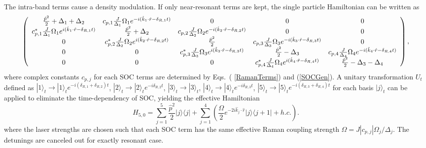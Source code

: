 \documentclass[twocolumn,prl,floatfix,citeautoscript,nofootinbib]{revtex4}
\begin{document}
The intra-band terms cause a density modulation. If only near-resonant terms
are kept, the single particle Hamiltonian can be written as
\[
\left(
\begin{array}{ccccc}
\frac{\hat{p}^{2}}{2}+\Delta _{1}+\Delta _{2} & c_{p,1}\frac{J}{\Delta _{1}}%
\Omega _{1}e^{-i(\hat{k}_{1}\cdot \hat{r}-\delta _{R,1}t)} & 0 & 0 & 0 \\
c_{p,1}^{\ast }\frac{J}{\Delta _{1}}\Omega _{1}e^{i(\hat{k}_{1}\cdot \hat{r}%
-\delta _{R,1}t)} & \frac{\hat{p}^{2}}{2}+\Delta _{2} & c_{p,2}\frac{J}{%
\Delta _{2}}\Omega _{2}e^{-i(\hat{k}_{2}\cdot \hat{r}-\delta _{R,2}t)} & 0 &
0 \\
0 & c_{p,2}^{\ast }\frac{J}{\Delta _{2}}\Omega _{2}e^{i(\hat{k}_{2}\cdot
\hat{r}-\delta _{R,2}t)} & \frac{\hat{p}^{2}}{2} & c_{p,3}\frac{J}{\Delta
_{3}}\Omega _{3}e^{-i(\hat{k}_{3}\cdot \hat{r}-\delta _{R,3}t)} & 0 \\
0 & 0 & c_{p,3}^{\ast }\frac{J}{\Delta _{3}}\Omega _{3}e^{i(\hat{k}_{3}\cdot
\hat{r}-\delta _{R,3}t)} & \frac{\hat{p}^{2}}{2}-\Delta _{3} & c_{p,4}\frac{J%
}{\Delta _{4}}\Omega _{4}e^{-i(\hat{k}_{4}\cdot \hat{r}-\delta _{R,4}t)} \\
0 & 0 & 0 & c_{p,4}^{\ast }\frac{J}{\Delta _{4}}\Omega _{4}e^{i(\hat{k}%
_{4}\cdot \hat{r}-\delta _{R,4}t)} & \frac{\hat{p}^{2}}{2}-\Delta
_{3}-\Delta _{4}%
\end{array}%
\right) ,
\]%
where complex constants $c_{p,j}$ for each SOC terms are determined by Eqs.~(%
\ref{RamanTerms}) and (\ref{SOCGen}). A unitary transformation $U_{t}$
defined as $|1\rangle _{t}\rightarrow |1\rangle _{t}e^{-i(\delta
_{R,1}+\delta _{R,2})t}$, $|2\rangle _{t}\rightarrow |2\rangle
_{t}e^{-i\delta _{R,2}t}$, $|3\rangle _{t}\rightarrow |3\rangle _{t}$, $%
|4\rangle _{t}\rightarrow |4\rangle _{t}e^{-i\delta _{R,3}t}$, $|5\rangle
_{t}\rightarrow |5\rangle _{t}e^{-i(\delta _{R,3}+\delta _{R,4})t}$ for each
basis $|j\rangle _{t}$ can be applied to eliminate the time-dependency of
SOC, yielding the effective Hamiltonian
\begin{equation}
H_{5,0}=\sum_{j=1}^{5}\frac{\hat{p}^{2}}{2}|j\rangle \langle
j|+\sum_{j=1}^{4}\left( \frac{\Omega }{2}e^{-2i\hat{k}_{j}\cdot \hat{r}%
}|j\rangle \langle j+1|+h.c.\right) .
\end{equation}%
where the laser strengths are chosen such that each SOC term has the same
effective Raman coupling strength $\Omega =J\left\vert c_{p,j}\right\vert
\Omega _{j}/\Delta _{j}$. The detunings are canceled out for exactly
resonant case.
\end{document}
